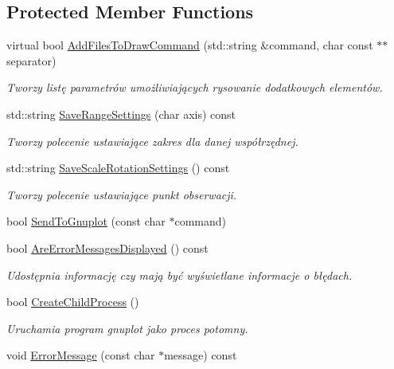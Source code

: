 \subsection*{Protected Member Functions}
\begin{DoxyCompactItemize}
\item 
virtual bool \hyperlink{class_pz_g_1_1_gnuplot_link_a0e0854467fcaf528a04a32e1e4e3fa37}{Add\+Files\+To\+Draw\+Command} (std\+::string \&command, char const $\ast$$\ast$separator)
\begin{DoxyCompactList}\small\item\em Tworzy listę parametrów umożliwiających rysowanie dodatkowych elementów. \end{DoxyCompactList}\item 
std\+::string \hyperlink{class_pz_g_1_1_gnuplot_link_ab6bf77a1d62d351a2edb737c48d9353d}{Save\+Range\+Settings} (char axis) const
\begin{DoxyCompactList}\small\item\em Tworzy polecenie ustawiające zakres dla danej współrzędnej. \end{DoxyCompactList}\item 
std\+::string \hyperlink{class_pz_g_1_1_gnuplot_link_a8dccd32a85d0be08c6bd98b62281c743}{Save\+Scale\+Rotation\+Settings} () const
\begin{DoxyCompactList}\small\item\em Tworzy polecenie ustawiające punkt obserwacji. \end{DoxyCompactList}\item 
bool \hyperlink{class_pz_g_1_1_gnuplot_link_acf0c0bf937eb87f9c14dedf2f01780bc}{Send\+To\+Gnuplot} (const char $\ast$command)
\item 
bool \hyperlink{class_pz_g_1_1_gnuplot_link_a7d5d83803ea886a7b056e1d7a473bb3a}{Are\+Error\+Messages\+Displayed} () const
\begin{DoxyCompactList}\small\item\em Udostępnia informację czy mają być wyświetlane informacje o błędach. \end{DoxyCompactList}\item 
bool \hyperlink{class_pz_g_1_1_gnuplot_link_a81a78898b39cb0b4c79ea4f3c90bbeb5}{Create\+Child\+Process} ()
\begin{DoxyCompactList}\small\item\em Uruchamia program {\itshape gnuplot} jako proces potomny. \end{DoxyCompactList}\item 
void \hyperlink{class_pz_g_1_1_gnuplot_link_a863bdb229a0d3e6d8d22cd5a4518d55e}{Error\+Message} (const char $\ast$message) const
$$
\end{DoxyCompactItemize}
